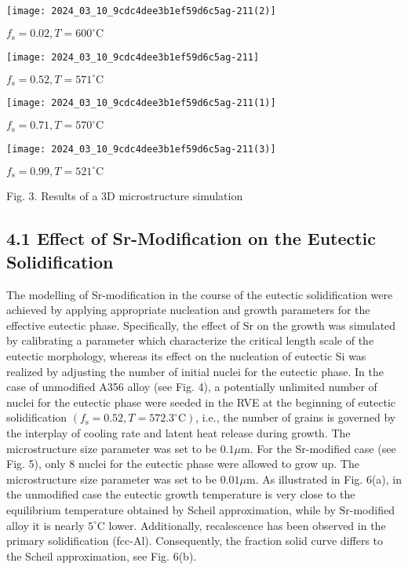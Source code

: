 \documentclass[10pt]{article}
\begin{document}
\begin{center}
\texttt{[image: 2024\_03\_10\_9cdc4dee3b1ef59d6c5ag-211(2)]}
\end{center}

$f_{\mathrm{s}}=0.02, T=600^{\circ} \mathrm{C}$

\begin{center}
\texttt{[image: 2024\_03\_10\_9cdc4dee3b1ef59d6c5ag-211]}
\end{center}

$f_{\mathrm{s}}=0.52, T=571^{\circ} \mathrm{C}$

\begin{center}
\texttt{[image: 2024\_03\_10\_9cdc4dee3b1ef59d6c5ag-211(1)]}
\end{center}

$f_{\mathrm{s}}=0.71, T=570^{\circ} \mathrm{C}$

\begin{center}
\texttt{[image: 2024\_03\_10\_9cdc4dee3b1ef59d6c5ag-211(3)]}
\end{center}

$f_{\mathrm{s}}=0.99, T=521^{\circ} \mathrm{C}$

Fig. 3. Results of a 3D microstructure simulation

\subsection*{4.1 Effect of Sr-Modification on the Eutectic Solidification}
The modelling of Sr-modification in the course of the eutectic solidification were achieved by applying appropriate nucleation and growth parameters for the effective eutectic phase. Specifically, the effect of $\mathrm{Sr}$ on the growth was simulated by calibrating a parameter which characterize the critical length scale of the eutectic morphology, whereas its effect on the nucleation of eutectic Si was realized by adjusting the number of initial nuclei for the eutectic phase. In the case of unmodified A356 alloy (see Fig. 4), a potentially unlimited number of nuclei for the eutectic phase were seeded in the RVE at the beginning of eutectic solidification $\left(f_{\mathrm{s}}=0.52, T=572.3^{\circ} \mathrm{C}\right)$, i.e., the number of grains is governed by the interplay of cooling rate and latent heat release during growth. The microstructure size parameter was set to be $0.1 \mu \mathrm{m}$. For the Sr-modified case (see Fig. 5), only 8 nuclei for the eutectic phase were allowed to grow up. The microstructure size parameter was set to be $0.01 \mu \mathrm{m}$. As illustrated in Fig. 6(a), in the unmodified case the eutectic growth temperature is very close to the equilibrium temperature obtained by Scheil approximation, while by $\mathrm{Sr}$-modified alloy it is nearly $5^{\circ} \mathrm{C}$ lower. Additionally, recalescence has been observed in the primary solidification (fcc-Al). Consequently, the fraction solid curve differs to the Scheil approximation, see Fig. 6(b).
\end{document}
